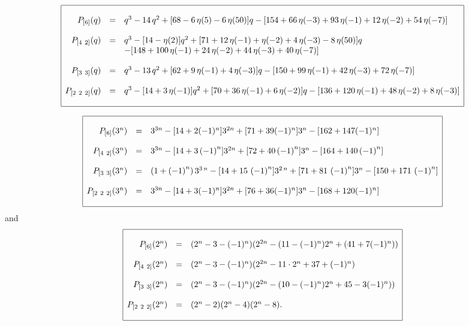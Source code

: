 \documentclass[10pt,a4paper,twoside]{article}
\begin{document}
\begin{small}
$$ \begin{array}{|rcl|}
\hline&&\\
P_{[6]}(q)&=&{q}^{3}-14\,{q}^{2}+[68-6\,\eta(5)-6\,
\eta(50)]q-[154+66\,\eta(-3)+93\,\eta(-1)+12\,
\eta(-2)+54\,\eta(-7)]\\
&& \\
P_{[4\ 2]}(q)& =&
{q}^{3}-[14-\eta(2)]{q}^{2}+[71+12\,\eta(-1)+\eta(-2)+4\,\eta(-3)-8\,\eta
(50)]q\\
& &-[148+100\,\eta(-1)+24\,\eta(-2)+44\,\eta(-3)+40\,\eta(-7)]\\
&& \\
P_{[3\ 3]}(q)& =& q^3-13\,{q}^{2}+[62+9\,\eta(-1)+4\,\eta(-3)]q
 -[150+99\,\eta(-1)+42\,\eta(-3)+72\,\eta(-7)]\\
&&\\
P_{[2\ 2\ 2]}(q)&=&q^3-[14+3\,\eta(-1)]{q}^{2}+[70+36\,\eta(-1)+6\,\eta(-2)]q
-[136+120\,\eta(-1)+48\,\eta(-2)+8\,\eta(-3)]\\
&&\\
\hline \end{array}
$$\end{small}

$$ \begin{array}{|rcl|}\hline&&\\
P_{[6]}(3^n)&=&3^{3n}-[14+2(-1)^n]3^{2n}+[71+39(-1)^n]3^n-[162+147(-1)^n]
\\
&&\\
P_{[4\ 2]}(3^n)&=& {3}^{3n}-[14+3\left (-1\right )^{n}]{3}^{2n}+[72+40\left (-1
\right )^{n}]{3}^{n}-[164+140\left (-1\right )^{n}]
\\
&& \\
P_{[3\ 3]}(3^n)&=&\left (1+\left (-1\right )^{n}\right ){3}^{3\,n}-[14+15\,\left (-1
\right )^{n}]{3}^{2\,n}+[71+81\,\left (-1\right )^{n}]{3}^{n}-
[150+171\,\left (-1\right )^{n}]
\\
&& \\
P_{[2\ 2\ 2]}(3^n)&=&3^{3n}-[14+3(-1)^n]{3}^{2n}+[76+36(-1)^n]3^n
-[168+120(-1)^n]\\
&&\\\hline \end{array}$$
and
$$ \begin{array}{|rcl|}
\hline &&\\
P_{[6]}(2^n)& =& (2^n-3-(-1)^n)(2^{2n}-(11-(-1)^n)2^n+(41+7(-1)^n)) \\
&&\\
P_{[4\ 2]}(2^n)& =&(2^n-3-(-1)^n)(2^{2n}-11\cdot2^n+37+(-1)^n)\\
&& \\
P_{[3\ 3]}(2^n)& =&(2^n-3-(-1)^n)(2^{2n}-(10-(-1)^n)2^n+45-3(-1)^n))\\
&&\\
P_{[2\ 2\ 2]}(2^n)&=& (2^n-2)(2^n-4)(2^n-8).\\
&&\\
\hline
 \end{array}
$$
\bigskip
\end{document}

